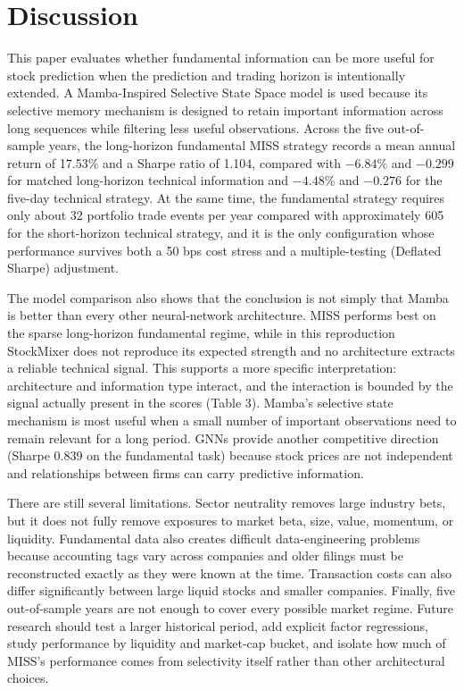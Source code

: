 \documentclass[12pt]{article}
\begin{document}
\section{Discussion}
This paper evaluates whether fundamental information can be more useful for stock prediction when the prediction and trading horizon is intentionally extended. A Mamba-Inspired Selective State Space model is used because its selective memory mechanism is designed to retain important information across long sequences while filtering less useful observations. Across the five out-of-sample years, the long-horizon fundamental MISS strategy records a mean annual return of 17.53\% and a Sharpe ratio of 1.104, compared with $-6.84\%$ and $-0.299$ for matched long-horizon technical information and $-4.48\%$ and $-0.276$ for the five-day technical strategy. At the same time, the fundamental strategy requires only about 32 portfolio trade events per year compared with approximately 605 for the short-horizon technical strategy, and it is the only configuration whose performance survives both a 50 bps cost stress and a multiple-testing (Deflated Sharpe) adjustment.

The model comparison also shows that the conclusion is not simply that Mamba is better than every other neural-network architecture. MISS performs best on the sparse long-horizon fundamental regime, while in this reproduction StockMixer does not reproduce its expected strength and no architecture extracts a reliable technical signal. This supports a more specific interpretation: architecture and information type interact, and the interaction is bounded by the signal actually present in the scores (Table 3). Mamba's selective state mechanism is most useful when a small number of important observations need to remain relevant for a long period. GNNs provide another competitive direction (Sharpe 0.839 on the fundamental task) because stock prices are not independent and relationships between firms can carry predictive information.

There are still several limitations. Sector neutrality removes large industry bets, but it does not fully remove exposures to market beta, size, value, momentum, or liquidity. Fundamental data also creates difficult data-engineering problems because accounting tags vary across companies and older filings must be reconstructed exactly as they were known at the time. Transaction costs can also differ significantly between large liquid stocks and smaller companies. Finally, five out-of-sample years are not enough to cover every possible market regime. Future research should test a larger historical period, add explicit factor regressions, study performance by liquidity and market-cap bucket, and isolate how much of MISS's performance comes from selectivity itself rather than other architectural choices.
\end{document}

